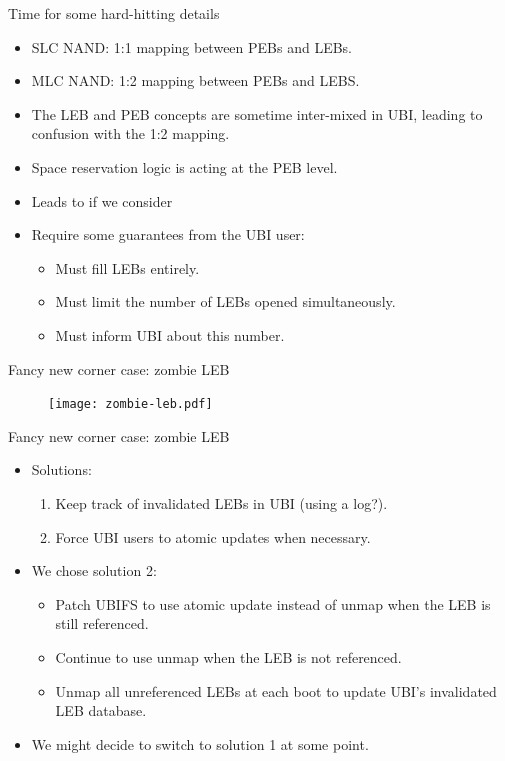\documentclass[aspectratio=169,obeyspaces,spaces,hyphens,dvipsnames]{beamer}
\begin{document}
\begin{frame}{Time for some hard-hitting details}
  \begin{itemize}
  \item SLC NAND: 1:1 mapping between PEBs and LEBs.
  \item MLC NAND: 1:2 mapping between PEBs and LEBS.
  \item The LEB and PEB concepts are sometime inter-mixed in UBI, leading
	to confusion with the 1:2 mapping.
  \item Space reservation logic is acting at the PEB level.
  \item Leads to  if we consider 
  \item Require some guarantees from the UBI user:
    \begin{itemize}
    \item Must fill LEBs entirely.
    \item Must limit the number of LEBs opened simultaneously.
    \item Must inform UBI about this number.
    \end{itemize}
  \end{itemize}
\end{frame}

\begin{frame}{Fancy new corner case: zombie LEB}
  \begin{figure}
  \texttt{[image: zombie-leb.pdf]}
  \end{figure}
\end{frame}

\begin{frame}{Fancy new corner case: zombie LEB}
  \begin{itemize}
  \item Solutions:
    \begin{enumerate}
    \item Keep track of invalidated LEBs in UBI (using a log?).
    \item Force UBI users to atomic updates when necessary.
    \end{enumerate}
  \item We chose solution 2:
    \begin{itemize}
    \item Patch UBIFS to use atomic update instead of unmap
	  when the LEB is still referenced.
    \item Continue to use unmap when the LEB is not referenced.
    \item Unmap all unreferenced LEBs at each boot to update
	  UBI's invalidated LEB database.
    \end{itemize}
  \item We might decide to switch to solution 1 at some point.
  \end{itemize}
\end{frame}
\end{document}
